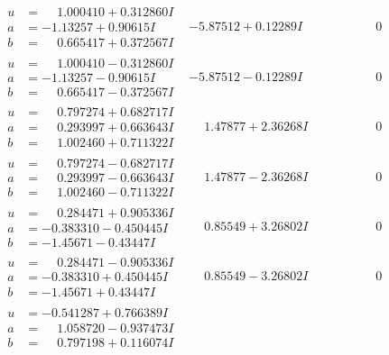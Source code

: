\documentclass[1p]{elsarticle_modified}
\theoremstyle{definition}
\begin{document}
$$\begin{array}{c|c|c}
\begin{aligned}
u &= \phantom{-}1.000410 + 0.312860 I \\
a &= -1.13257 + 0.90615 I \\
b &= \phantom{-}0.665417 + 0.372567 I\end{aligned}
 & -5.87512 + 0.12289 I & \phantom{-0.000000 } 0 \\ \hline\begin{aligned}
u &= \phantom{-}1.000410 - 0.312860 I \\
a &= -1.13257 - 0.90615 I \\
b &= \phantom{-}0.665417 - 0.372567 I\end{aligned}
 & -5.87512 - 0.12289 I & \phantom{-0.000000 } 0 \\ \hline\begin{aligned}
u &= \phantom{-}0.797274 + 0.682717 I \\
a &= \phantom{-}0.293997 + 0.663643 I \\
b &= \phantom{-}1.002460 + 0.711322 I\end{aligned}
 & \phantom{-}1.47877 + 2.36268 I & \phantom{-0.000000 } 0 \\ \hline\begin{aligned}
u &= \phantom{-}0.797274 - 0.682717 I \\
a &= \phantom{-}0.293997 - 0.663643 I \\
b &= \phantom{-}1.002460 - 0.711322 I\end{aligned}
 & \phantom{-}1.47877 - 2.36268 I & \phantom{-0.000000 } 0 \\ \hline\begin{aligned}
u &= \phantom{-}0.284471 + 0.905336 I \\
a &= -0.383310 - 0.450445 I \\
b &= -1.45671 - 0.43447 I\end{aligned}
 & \phantom{-}0.85549 + 3.26802 I & \phantom{-0.000000 } 0 \\ \hline\begin{aligned}
u &= \phantom{-}0.284471 - 0.905336 I \\
a &= -0.383310 + 0.450445 I \\
b &= -1.45671 + 0.43447 I\end{aligned}
 & \phantom{-}0.85549 - 3.26802 I & \phantom{-0.000000 } 0 \\ \hline\begin{aligned}
u &= -0.541287 + 0.766389 I \\
a &= \phantom{-}1.058720 - 0.937473 I \\
b &= \phantom{-}0.797198 + 0.116074 I\end{aligned}

\end{array}$$
\end{document}
